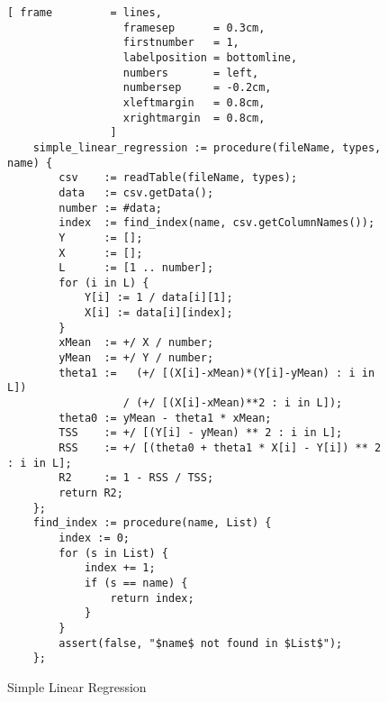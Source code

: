 \begin{figure}[!ht]
\centering
\begin{Verbatim}[ frame         = lines, 
                  framesep      = 0.3cm, 
                  firstnumber   = 1,
                  labelposition = bottomline,
                  numbers       = left,
                  numbersep     = -0.2cm,
                  xleftmargin   = 0.8cm,
                  xrightmargin  = 0.8cm,
                ]
    simple_linear_regression := procedure(fileName, types, name) {
        csv    := readTable(fileName, types);
        data   := csv.getData();
        number := #data;
        index  := find_index(name, csv.getColumnNames());
        Y      := [];
        X      := [];
        L      := [1 .. number];
        for (i in L) {
            Y[i] := 1 / data[i][1];
            X[i] := data[i][index];
        }
        xMean  := +/ X / number;
        yMean  := +/ Y / number;
        theta1 :=   (+/ [(X[i]-xMean)*(Y[i]-yMean) : i in L]) 
                  / (+/ [(X[i]-xMean)**2 : i in L]);
        theta0 := yMean - theta1 * xMean;
        TSS    := +/ [(Y[i] - yMean) ** 2 : i in L];
        RSS    := +/ [(theta0 + theta1 * X[i] - Y[i]) ** 2 : i in L];
        R2     := 1 - RSS / TSS;
        return R2;
    };
    find_index := procedure(name, List) {
        index := 0;
        for (s in List) {
            index += 1;
            if (s == name) {
                return index;
            }
        }
        assert(false, "$name$ not found in $List$");
    };
\end{Verbatim}
\vspace*{-0.3cm}
\caption{Simple Linear Regression}
\label{fig:simple-linear-regression.stlx}
\end{figure}


